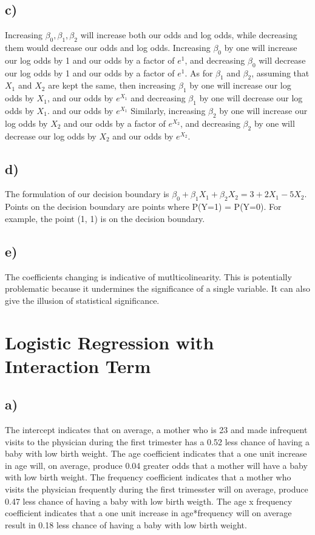 \documentclass[12pt, letterpaper]{article}
\begin{document}
\subsection*{c)} Increasing $\beta_0, \beta_1, \beta_2$ will increase both our odds and log odds, while decreasing them would decrease our odds and log odds. Increasing $\beta_0$ by one will increase our log odds by 1 and our odds by a factor of $e^1$, and decreasing $\beta_0$ will decrease our log odds by 1 and our odds by a factor of $e^1$. As for $\beta_1$ and $\beta_2$, assuming that $X_1$ and $X_2$ are kept the same, then increasing $\beta_1$ by one will increase our log odds by $X_1$, and our odds by $e^{X_1}$ and decreasing $\beta_1$ by one will decrease our log odds by $X_1$. and our odds by $e^{X_1}$ Similarly, increasing $\beta_2$ by one will increase our log odds by $X_2$ and our odds by a factor of $e^{X_2}$, and decreasing $\beta_2$ by one will decrease our log odds by $X_2$ and our odds by $e^{X_2}$. 

\subsection*{d)} The formulation of our decision boundary is $\beta_0 + \beta_1X_1 + \beta_2X_2 = 3 + 2X_1 - 5X_2$. Points on the decision boundary are points where P(Y=1) = P(Y=0). For example, the point (1, 1) is on the decision boundary.

\subsection*{e)} The coefficients changing is indicative of mutlticolinearity. This is potentially problematic because it undermines the significance of a single variable. It can also give the illusion of statistical significance.

\newpage
\section{Logistic Regression with Interaction Term}
\subsection*{a)} The intercept indicates that on average, a mother who is 23 and made infrequent visits to the physician during the first trimester has a 0.52 less chance of having a baby with low birth weight. The age coefficient indicates that a one unit increase in age will, on average, produce 0.04 greater odds that a mother will have a baby with low birth weight. The frequency coefficient indicates that a mother who visits the physician frequently during the first trimesster will on average, produce 0.47 less chance of having a baby with low birth weigth. The age x frequency coefficient indicates that a one unit increase in age*frequency will on average result in 0.18 less chance of having a baby with low birth weight.
\end{document}
